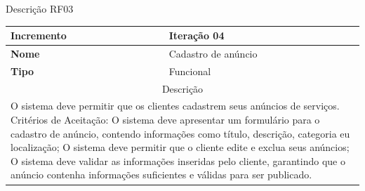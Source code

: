 \clearpage
\begin{quadro}[htb]
	\centering
	\caption{\label{Formatação do texto.}Descrição RF03}	
	\begin{tabular}{|l|p{11cm}|}
		\hline
		\textbf{Incremento}    & Iteração 04\\ \hline
		\textbf{Nome}    & Cadastro de anúncio\\ \hline
		\textbf{Tipo}    & Funcional\\ \hline
		\multicolumn{2}{|c|}{Descrição}\\ \hline
		\multicolumn{2}{|p{12cm}|}{
			O sistema deve permitir que os clientes cadastrem seus anúncios de serviços. \newline
			\newline Critérios de Aceitação: \newline
			O sistema deve apresentar um formulário para o cadastro de anúncio, contendo informações como título, descrição, categoria eu localização; \newline
			\newline O sistema deve permitir que o cliente edite e exclua seus anúncios;\newline
			\newline O sistema deve validar as informações inseridas pelo cliente, garantindo que o anúncio contenha informações suficientes e válidas para ser publicado.
			} \\ \hline
	\end{tabular}
\end{quadro}

